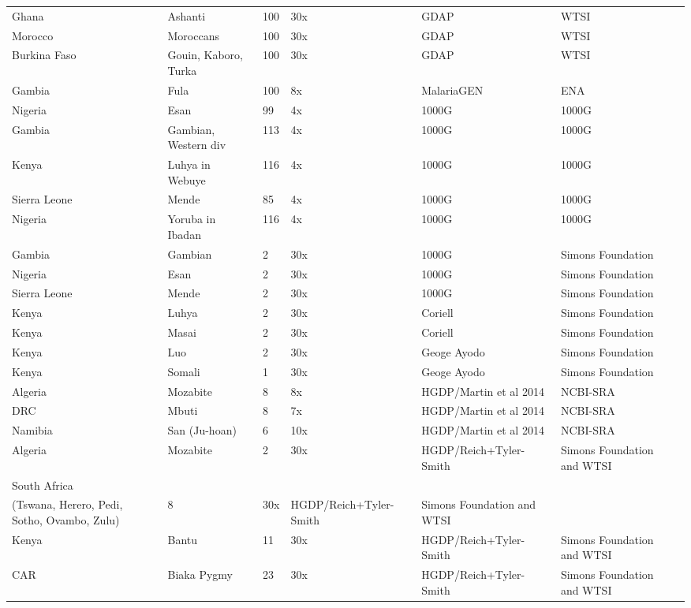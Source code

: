 \begin{landscape}
\begin{longtable}{lllllll}
Ghana & Ashanti & 100 & 30x & GDAP & WTSI \\
Morocco & Moroccans & 100 & 30x & GDAP & WTSI \\
Burkina Faso & Gouin, Kaboro, Turka & 100 & 30x & GDAP & WTSI \\
Gambia & Fula & 100 & 8x & MalariaGEN & ENA \\
Nigeria & Esan & 99 & 4x & 1000G & 1000G \\
Gambia & Gambian, Western div & 113 & 4x & 1000G & 1000G \\
Kenya & Luhya in Webuye & 116 & 4x & 1000G & 1000G \\
Sierra Leone & Mende & 85 & 4x & 1000G & 1000G \\
Nigeria & Yoruba in Ibadan & 116 & 4x & 1000G & 1000G \\
Gambia & Gambian & 2 & 30x & 1000G & Simons Foundation \\
Nigeria & Esan & 2 & 30x & 1000G & Simons Foundation \\
Sierra Leone & Mende & 2 & 30x & 1000G & Simons Foundation \\
Kenya & Luhya & 2 & 30x & Coriell & Simons Foundation \\
Kenya & Masai & 2 & 30x & Coriell & Simons Foundation \\
Kenya & Luo & 2 & 30x & Geoge Ayodo & Simons Foundation \\
Kenya & Somali & 1 & 30x & Geoge Ayodo & Simons Foundation \\
Algeria & Mozabite & 8 & 8x & HGDP/Martin et al 2014 & NCBI-SRA \\
DRC & Mbuti & 8 & 7x & HGDP/Martin et al 2014 & NCBI-SRA \\
Namibia & San (Ju-hoan) & 6 & 10x & HGDP/Martin et al 2014 & NCBI-SRA \\
Algeria & Mozabite & 2 & 30x & HGDP/Reich+Tyler-Smith & Simons Foundation and WTSI \\
South Africa & \begin{tabular}[b]{@{}l@{}}Bantu\\(Tswana, Herero, Pedi, Sotho, Ovambo, Zulu)\end{tabular} & 8 & 30x & HGDP/Reich+Tyler-Smith & Simons Foundation and WTSI \\
Kenya & Bantu & 11 & 30x & HGDP/Reich+Tyler-Smith & Simons Foundation and WTSI \\
CAR & Biaka Pygmy & 23 & 30x & HGDP/Reich+Tyler-Smith & Simons Foundation and WTSI \\

\end{longtable}
\end{landscape}
